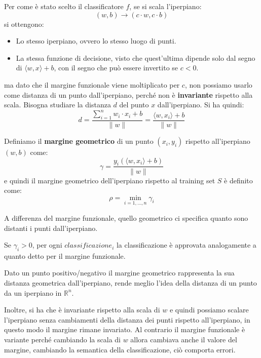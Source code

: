 Per come è stato scelto il classificatore $f$, se si scala l'iperpiano:
\begin{equation}
    (w, b) \to (c \cdot w, c\cdot b)
\end{equation}
si ottengono:
\begin{itemize}
    \item Lo stesso iperpiano, ovvero lo stesso luogo di punti.
    \item La stessa funzione di decisione, visto che quest'ultima dipende solo
          dal segno di $\langle w, x \rangle + b$, con il segno che può essere
          invertito se $c < 0$.
\end{itemize}
ma dato che il margine funzionale viene moltiplicato per $c$, non possiamo usarlo
come distanza di un punto dall'iperpiano, perché non è \textbf{invariante} rispetto
alla scala. Bisogna studiare la distanza $d$ del punto $x$ dall'iperpiano. Si ha
quindi:
\begin{equation}
    d = \frac{\sum_{i = 1} ^ n w_i \cdot x_i + b}{\| w \|} =
    \frac{\langle w, x_i \rangle + b}{\|  w \|}
\end{equation}
\begin{definizione}
    Definiamo il \textbf{margine geometrico} di un punto $(x_i, y_i)$ rispetto
    all'iperpiano $(w, b)$ come:
    \begin{equation}
        \gamma = \frac{y_i(\langle w, x_i \rangle + b)}{\| w \|}
    \end{equation}
    e quindi il margine geometrico dell'iperpiano rispetto al training set $S$ è
    definito come:
    \begin{equation}
        \rho =  \min_{i = 1, \dots, n} {\gamma}_i
    \end{equation}
\end{definizione}
A differenza del margine funzionale, quello geometrico ci specifica quanto
sono distanti i punti dall'iperpiano.
\begin{teorema}
    Se $\gamma_i > 0$, per ogni $classificazione_i$ la classificazione è approvata
    analogamente a quanto detto per il margine funzionale.
\end{teorema}
Dato un punto positivo/negativo il margine geometrico rappresenta la sua distanza
geometrica dall'iperpiano, rende meglio l'idea della distanza di un punto da un 
iperpiano in $\mathbb{R}^n$.

Inoltre, si ha che è invariante rispetto alla scala di $w$ e quindi possiamo 
scalare l'iperpiano senza cambiamenti della distanza dei punti rispetto 
all'iperpiano, in questo modo il margine rimane invariato. Al contrario il 
margine funzionale è variante perché cambiando la scala di $w$ allora cambiava
anche il valore del margine, cambiando la semantica della classificazione, ciò
comporta errori.

